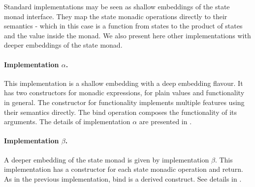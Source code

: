 

Standard implementations may be seen as shallow embeddings of the
state monad interface.
%
They map the state monadic operations directly to their semantics -
which in this case is a function from states to the product of states
and the value inside the monad.
%
%
We also present here other implementations with deeper embeddings of
the state monad.


\paragraph{Implementation $\alpha$.}
This implementation is a shallow embedding with a deep embedding
flavour.
%
It has two constructors for monadic expressions, for plain values and
functionality in general.
%
The constructor for functionality implements multiple features using
their semantics directly.
%
The bind operation composes the functionality of its arguments.
%
The details of implementation $\alpha$ are presented in
.


\paragraph{Implementation $\beta$.}
A deeper embedding of the state monad is given by implementation
$\beta$.
%
This implementation has a constructor for each state monadic
operation and return.
%
As in the previous implementation, bind is a derived construct.
%
See details in .

